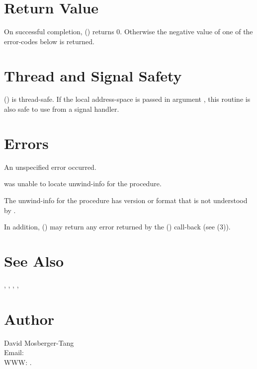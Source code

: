 \documentclass{article}
\begin{document}
\section{Return Value}

On successful completion, ()
returns 0.  Otherwise the negative value of one of the error-codes
below is returned.

\section{Thread and Signal Safety}

() is thread-safe.  If the local
address-space is passed in argument , this routine is also
safe to use from a signal handler.

\section{Errors}

\begin{Description}
\item[\Const{UNW\_EUNSPEC}] An unspecified error occurred.
\item[\Const{UNW\_ENOINFO}]  was unable to locate
  unwind-info for the procedure.
\item[\Const{UNW\_EBADVERSION}] The unwind-info for the procedure has
  version or format that is not understood by .
\end{Description}
In addition, () may return any error
returned by the () call-back (see
(3)).

\section{See Also}

,
,
,
,

\section{Author}

\noindent
David Mosberger-Tang\\
Email: \\
WWW: .
\LatexManEnd
\end{document}
